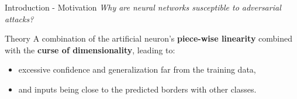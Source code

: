\documentclass{beamer}
\begin{document}
\begin{frame}{Introduction - Motivation}
    \centering \emph{Why are neural networks susceptible to adversarial attacks?}

    \begin{block}{Theory}
    A combination of the artificial neuron's \textbf{piece-wise linearity} combined with the \textbf{curse of dimensionality}, leading to:
    \begin{itemize}
        \item excessive confidence and generalization far from the training data,
        \item and inputs being close to the predicted borders with other classes.
    \end{itemize}
    \end{block}
    

\end{frame}
\end{document}
